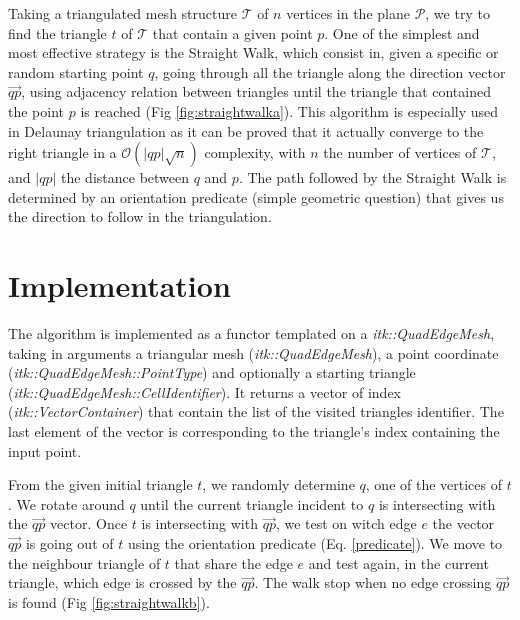 \documentclass{InsightArticle}
\begin{document}
Taking a triangulated mesh structure $\mathcal{T}$ of $\mathit{n}$ vertices in the plane $\mathcal{P}$, we try to find the triangle $\mathit{t}$ of $\mathcal{T}$ that contain a given point $\mathit{p}$. One of the simplest and most effective strategy is the Straight Walk, which consist in, given a specific or random starting point $\mathit{q}$, going through all the triangle along the direction vector $\overrightarrow{\mathit{qp}}$, using adjacency relation between triangles until the triangle that contained the point $\mathit{p}$ is reached (Fig \ref{fig:straightwalka}).
This algorithm is especially used in Delaunay triangulation as it can be proved that it actually converge to the right triangle in a $\mathcal{O}(\lvert \mathit{qp}\rvert \sqrt{\mathit{n}})$ complexity, with $\mathit{n}$ the number of vertices of $\mathcal{T}$, and $\lvert\mathit{qp}\rvert$ the distance between $\mathit{q}$ and $\mathit{p}$.
The path followed by the Straight Walk is determined by an orientation predicate (simple geometric question) that gives us the direction to follow in the triangulation.

\section{Implementation}

The algorithm is implemented as a functor templated on a \emph{itk::QuadEdgeMesh}, taking in arguments a triangular mesh (\textit{itk::QuadEdgeMesh}), a point coordinate (\textit{itk::QuadEdgeMesh::PointType}) and optionally a starting triangle (\textit{itk::QuadEdgeMesh::CellIdentifier}). It returns a vector of index (\textit{itk::VectorContainer}) that contain the list of the visited triangles identifier. The last element of the vector is corresponding to the triangle's index containing the input point.

From the given initial triangle $\mathit{t}$, we randomly determine $\mathit{q}$, one of the vertices of $\mathit{t}$. We rotate around $\mathit{q}$ until the current triangle incident to $\mathit{q}$ is intersecting with the $\overrightarrow{\mathit{qp}}$ vector. Once $\mathit{t}$ is intersecting with $\overrightarrow{\mathit{qp}}$, we test on witch edge $\mathit{e}$ the vector $\overrightarrow{\mathit{qp}}$ is going out of $\mathit{t}$ using the orientation predicate (Eq. \ref{predicate}). We move to the neighbour triangle of $\mathit{t}$ that share the edge $\mathit{e}$ and test again, in the current triangle, which edge is crossed by the $\overrightarrow{\mathit{qp}}$. The walk stop when no edge crossing $\overrightarrow{\mathit{qp}}$ is found (Fig \ref{fig:straightwalkb}).
\end{document}
